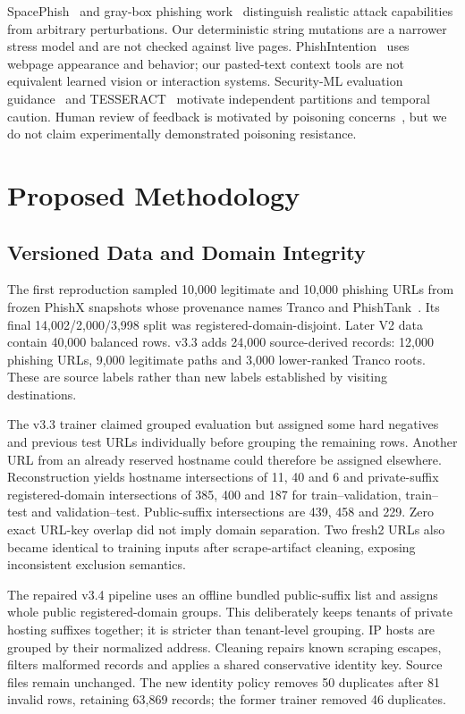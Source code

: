 \documentclass[conference,a4paper]{IEEEtran}
\begin{document}
SpacePhish~\cite{spacephish} and gray-box phishing work~\cite{graybox} distinguish realistic attack capabilities from arbitrary perturbations. Our deterministic string mutations are a narrower stress model and are not checked against live pages. PhishIntention~\cite{phishintention} uses webpage appearance and behavior; our pasted-text context tools are not equivalent learned vision or interaction systems. Security-ML evaluation guidance~\cite{arp} and TESSERACT~\cite{tesseract} motivate independent partitions and temporal caution. Human review of feedback is motivated by poisoning concerns~\cite{poisoning}, but we do not claim experimentally demonstrated poisoning resistance.

\section{Proposed Methodology}
\subsection{Versioned Data and Domain Integrity}
The first reproduction sampled 10,000 legitimate and 10,000 phishing URLs from frozen PhishX snapshots whose provenance names Tranco and PhishTank~\cite{tranco,phishtank,phishxcode}. Its final 14,002/2,000/3,998 split was registered-domain-disjoint. Later V2 data contain 40,000 balanced rows. v3.3 adds 24,000 source-derived records: 12,000 phishing URLs, 9,000 legitimate paths and 3,000 lower-ranked Tranco roots. These are source labels rather than new labels established by visiting destinations.

The v3.3 trainer claimed grouped evaluation but assigned some hard negatives and previous test URLs individually before grouping the remaining rows. Another URL from an already reserved hostname could therefore be assigned elsewhere. Reconstruction yields hostname intersections of 11, 40 and 6 and private-suffix registered-domain intersections of 385, 400 and 187 for train--validation, train--test and validation--test. Public-suffix intersections are 439, 458 and 229. Zero exact URL-key overlap did not imply domain separation. Two fresh2 URLs also became identical to training inputs after scrape-artifact cleaning, exposing inconsistent exclusion semantics.

The repaired v3.4 pipeline uses an offline bundled public-suffix list and assigns whole public registered-domain groups. This deliberately keeps tenants of private hosting suffixes together; it is stricter than tenant-level grouping. IP hosts are grouped by their normalized address. Cleaning repairs known scraping escapes, filters malformed records and applies a shared conservative identity key. Source files remain unchanged. The new identity policy removes 50 duplicates after 81 invalid rows, retaining 63,869 records; the former trainer removed 46 duplicates.
\end{document}
